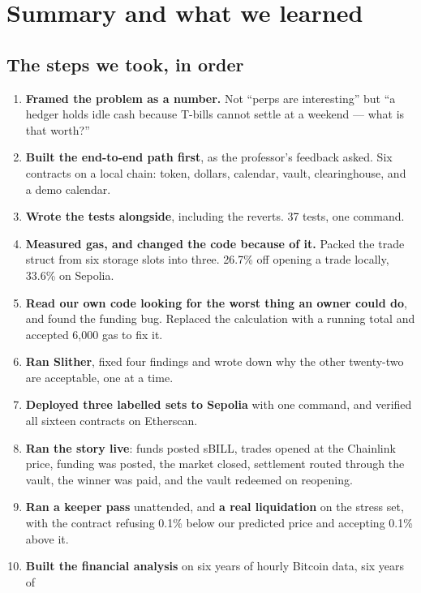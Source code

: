 \documentclass[11pt,a4paper]{article}
\begin{document}
\section{Summary and what we learned}\label{sec:summary}

\subsection{The steps we took, in order}

\begin{enumerate}
  \item \textbf{Framed the problem as a number.} Not ``perps are interesting'' but ``a hedger holds
  idle cash because T-bills cannot settle at a weekend --- what is that worth?''
  \item \textbf{Built the end-to-end path first}, as the professor's feedback asked. Six contracts
  on a local chain: token, dollars, calendar, vault, clearinghouse, and a demo calendar.
  \item \textbf{Wrote the tests alongside}, including the reverts. 37 tests, one command.
  \item \textbf{Measured gas, and changed the code because of it.} Packed the trade struct from six
  storage slots into three. 26.7\% off opening a trade locally, 33.6\% on Sepolia.
  \item \textbf{Read our own code looking for the worst thing an owner could do}, and found the
  funding bug. Replaced the calculation with a running total and accepted 6,000 gas to fix it.
  \item \textbf{Ran Slither}, fixed four findings and wrote down why the other twenty-two are
  acceptable, one at a time.
  \item \textbf{Deployed three labelled sets to Sepolia} with one command, and verified all sixteen
  contracts on Etherscan.
  \item \textbf{Ran the story live}: funds posted sBILL, trades opened at the Chainlink price,
  funding was posted, the market closed, settlement routed through the vault, the winner was paid,
  and the vault redeemed on reopening.
  \item \textbf{Ran a keeper pass} unattended, and \textbf{a real liquidation} on the stress set,
  with the contract refusing 0.1\% below our predicted price and accepting 0.1\% above it.
  \item \textbf{Built the financial analysis} on six years of hourly Bitcoin data, six years of

\end{enumerate}
\end{document}

